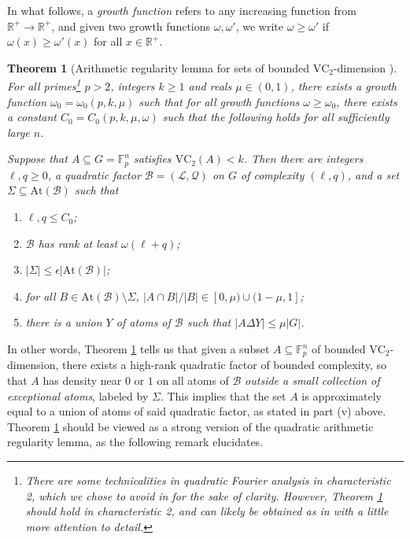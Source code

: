 \documentclass[12pt,oneside,british,a4wide]{amsart}
\newtheorem{theorem}{Theorem}[section]
\numberwithin{equation}{section}
\theoremstyle{definition}
\def\F{\mathbb{F}}
\def\VC{\mathrm{VC}}
\def\e{\epsilon}
\newcommand{\calL}{\mathcal{L}}
\newcommand{\calB}{\mathcal{B}}
\newcommand{\calQ}{\mathcal{Q}}
\newcommand{\At}{{\mathrm{At}}}
\begin{document}
In what follows, a \emph{growth function} refers to any increasing function from $\mathbb{R}^+\rightarrow \mathbb{R}^+$, and given two growth functions $\omega, \omega'$, we write $\omega\geq \omega'$ if $\omega(x)\geq \omega'(x)$ for all $x\in \mathbb{R}^+$. 

\begin{theorem}[Arithmetic regularity lemma for sets of bounded $\VC_2$-dimension \cite{Terry.2021d}]\label{thm:vc2finite}
For all primes\footnote{There are some technicalities in quadratic Fourier analysis in characteristic 2, which we chose to avoid in \cite{Terry.2021d} for the sake of clarity. However, Theorem \ref{thm:vc2finite} should hold in characteristic 2, and can likely be obtained as in \cite{Terry.2021d} with a little more attention to detail.} $p>2$, integers $k\geq 1$ and reals $\mu\in (0,1)$, there exists a growth function $\omega_0=\omega_0(p,k,\mu)$ such that for all growth functions $\omega\geq\omega_0$, there exists a constant $C_0=C_0(p,k,\mu,\omega)$ such that the following holds  for all sufficiently large $n$.  

Suppose that $A\subseteq G=\F_p^n$ satisfies $\VC_2(A)<k$.  Then there are integers $\ell,q\geq 0$, a quadratic factor $\calB=(\calL,\calQ)$ on $G$ of complexity $(\ell,q)$, and a set $\Sigma \subseteq \At(\calB)$ such that 
\begin{enumerate}[label=\normalfont(\roman*)] 
\item $\ell,q\leq C_0$;
\item $\calB$ has rank at least $\omega(\ell+q)$;
\item $|\Sigma|\leq \e |\At(\calB)|$; 
\item for all $B\in \At(\calB)\setminus \Sigma$, $|A\cap B|/|B|\in [0,\mu)\cup (1-\mu,1]$;
\item there is a union $Y$ of atoms of $\calB$ such that $|A\Delta Y|\leq \mu|G|$. 
\end{enumerate}
\end{theorem}

 In other words, Theorem \ref{thm:vc2finite} tells us that given a subset $A\subseteq \F_p^n$ of bounded $\VC_2$-dimension, there exists a high-rank quadratic factor of bounded complexity, so that $A$ has density near $0$ or $1$ on all atoms of $\calB$ \emph{outside a small collection of exceptional atoms}, labeled by $\Sigma$.  This implies that the set $A$ is approximately equal to a union  of atoms of said quadratic factor, as stated in part (v) above.  Theorem \ref{thm:vc2finite} should be viewed as a strong version of the quadratic arithmetic regularity lemma, as the following remark elucidates.
 
\end{document}
